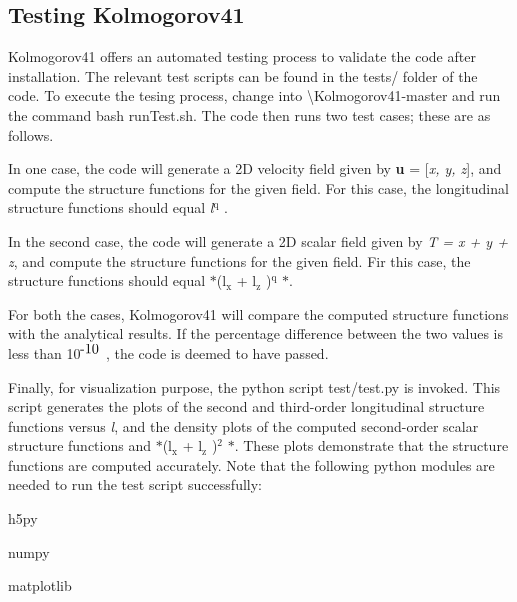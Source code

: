 \subsection*{Testing {\ttfamily Kolmogorov41}}

{\ttfamily Kolmogorov41} offers an automated testing process to validate the code after installation. The relevant test scripts can be found in the {\ttfamily tests/} folder of the code. To execute the tesing process, change into {\ttfamily \textbackslash{}Kolmogorov41-\/master} and run the command {\ttfamily bash run\-Test.\-sh}. The code then runs two test cases; these are as follows.


\begin{DoxyItemize}
\item In one case, the code will generate a 2\-D velocity field given by {\bfseries u} = \mbox{[}{\itshape x, y, z}\mbox{]}, and compute the structure functions for the given field. For this case, the longitudinal structure functions should equal {\itshape l$^{\mbox{q}}$ }.
\item In the second case, the code will generate a 2\-D scalar field given by {\itshape T = x + y + z}, and compute the structure functions for the given field. Fir this case, the structure functions should equal $\ast$(l$_{\mbox{x}}$  + l$_{\mbox{z}}$ )$^{\mbox{q}}$ $\ast$.
\end{DoxyItemize}

For both the cases, {\ttfamily Kolmogorov41} will compare the computed structure functions with the analytical results. If the percentage difference between the two values is less than 10$^{\mbox{-\/10}}$ , the code is deemed to have passed.

Finally, for visualization purpose, the python script {\ttfamily test/test.\-py} is invoked. This script generates the plots of the second and third-\/order longitudinal structure functions versus {\itshape l}, and the density plots of the computed second-\/order scalar structure functions and $\ast$(l$_{\mbox{x}}$  + l$_{\mbox{z}}$ )$^{\mbox{2}}$ $\ast$. These plots demonstrate that the structure functions are computed accurately. Note that the following python modules are needed to run the test script successfully\-:


\begin{DoxyEnumerate}
\item {\ttfamily h5py}
\item {\ttfamily numpy}
\item {\ttfamily matplotlib}
\end{DoxyEnumerate}

